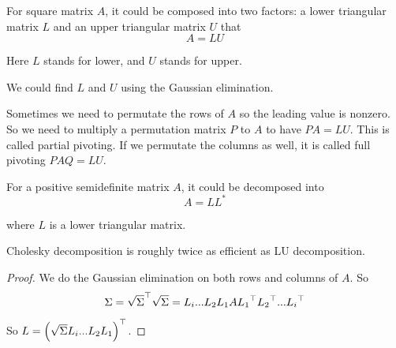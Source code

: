 \begin{theorem}
    For square matrix $A$, it could be composed into two factors: a lower triangular matrix $L$ and an upper triangular matrix $U$ that
    \begin{equation}
        A = LU
    \end{equation}
    
    Here $L$ stands for lower, and $U$ stands for upper.
    
    We could find $L$ and $U$ using the Gaussian elimination.
    
    Sometimes we need to permutate the rows of $A$ so the leading value is nonzero. So we need to multiply a permutation matrix $P$ to $A$ to have $PA = LU$. This is called partial pivoting. If we permutate the columns as well, it is called full pivoting $PAQ = LU$.
\end{theorem}

\begin{theorem}
    For a positive semidefinite matrix $A$, it could be decomposed into 
    \begin{equation}
        A = L L^*
    \end{equation}
    
    where $L$ is a lower triangular matrix.
    
    Cholesky decomposition is roughly twice as efficient as LU decomposition.
\end{theorem}
\begin{proof}
    We do the Gaussian elimination on both rows and columns of $A$. So 
    \begin{equation}
        \Sigma = {\sqrt{\Sigma}}^\top \sqrt{\Sigma} = L_i ... L_2 L_1 A {L_1}^\top {L_2}^\top ... {L_i}^\top
    \end{equation}
    
    So $L = {\left(\sqrt{\Sigma}L_i ... L_2 L_1\right)}^\top$.
\end{proof}

























